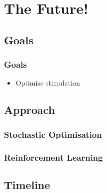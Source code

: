 \documentclass{beamer}
\begin{document}
\section{The Future!}
\subsection{Goals}

\begin{frame}
  \frametitle{Goals}
  \begin{itemize}
    \item Optimise stimulation
  \end{itemize}
\end{frame}

\subsection{Approach}

\begin{frame}
  \frametitle{Stochastic Optimisation}
\end{frame}

\begin{frame}
  \frametitle{Reinforcement Learning}
\end{frame}

\subsection{Timeline}
\end{document}
